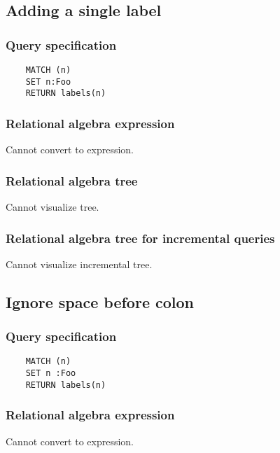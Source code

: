 	\subsection{Adding a single label}

	\subsubsection*{Query specification}

	\begin{lstlisting}
	MATCH (n)
	SET n:Foo
	RETURN labels(n)
	\end{lstlisting}


	\subsubsection*{Relational algebra expression}

	Cannot convert to expression.

	\subsubsection*{Relational algebra tree}

	Cannot visualize tree.

	\subsubsection*{Relational algebra tree for incremental queries}

	Cannot visualize incremental tree.
	\subsection{Ignore space before colon}

	\subsubsection*{Query specification}

	\begin{lstlisting}
	MATCH (n)
	SET n :Foo
	RETURN labels(n)
	\end{lstlisting}


	\subsubsection*{Relational algebra expression}

	Cannot convert to expression.

